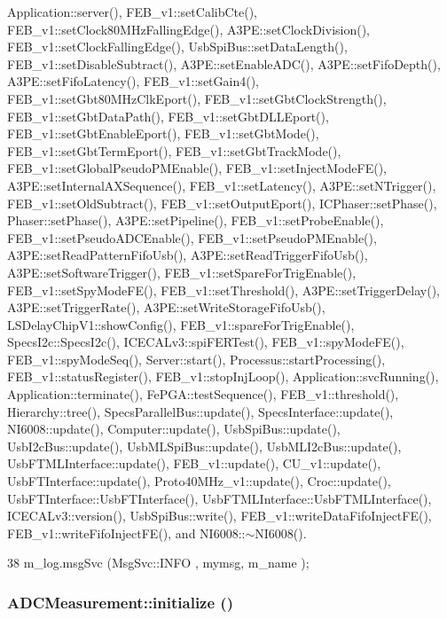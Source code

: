 Application::server(), FEB\_\-v1::setCalibCte(), FEB\_\-v1::setClock80MHzFallingEdge(), A3PE::setClockDivision(), FEB\_\-v1::setClockFallingEdge(), UsbSpiBus::setDataLength(), FEB\_\-v1::setDisableSubtract(), A3PE::setEnableADC(), A3PE::setFifoDepth(), A3PE::setFifoLatency(), FEB\_\-v1::setGain4(), FEB\_\-v1::setGbt80MHzClkEport(), FEB\_\-v1::setGbtClockStrength(), FEB\_\-v1::setGbtDataPath(), FEB\_\-v1::setGbtDLLEport(), FEB\_\-v1::setGbtEnableEport(), FEB\_\-v1::setGbtMode(), FEB\_\-v1::setGbtTermEport(), FEB\_\-v1::setGbtTrackMode(), FEB\_\-v1::setGlobalPseudoPMEnable(), FEB\_\-v1::setInjectModeFE(), A3PE::setInternalAXSequence(), FEB\_\-v1::setLatency(), A3PE::setNTrigger(), FEB\_\-v1::setOldSubtract(), FEB\_\-v1::setOutputEport(), ICPhaser::setPhase(), Phaser::setPhase(), A3PE::setPipeline(), FEB\_\-v1::setProbeEnable(), FEB\_\-v1::setPseudoADCEnable(), FEB\_\-v1::setPseudoPMEnable(), A3PE::setReadPatternFifoUsb(), A3PE::setReadTriggerFifoUsb(), A3PE::setSoftwareTrigger(), FEB\_\-v1::setSpareForTrigEnable(), FEB\_\-v1::setSpyModeFE(), FEB\_\-v1::setThreshold(), A3PE::setTriggerDelay(), A3PE::setTriggerRate(), A3PE::setWriteStorageFifoUsb(), LSDelayChipV1::showConfig(), FEB\_\-v1::spareForTrigEnable(), SpecsI2c::SpecsI2c(), ICECALv3::spiFERTest(), FEB\_\-v1::spyModeFE(), FEB\_\-v1::spyModeSeq(), Server::start(), Processus::startProcessing(), FEB\_\-v1::statusRegister(), FEB\_\-v1::stopInjLoop(), Application::svcRunning(), Application::terminate(), FePGA::testSequence(), FEB\_\-v1::threshold(), Hierarchy::tree(), SpecsParallelBus::update(), SpecsInterface::update(), NI6008::update(), Computer::update(), UsbSpiBus::update(), UsbI2cBus::update(), UsbMLSpiBus::update(), UsbMLI2cBus::update(), UsbFTMLInterface::update(), FEB\_\-v1::update(), CU\_\-v1::update(), UsbFTInterface::update(), Proto40MHz\_\-v1::update(), Croc::update(), UsbFTInterface::UsbFTInterface(), UsbFTMLInterface::UsbFTMLInterface(), ICECALv3::version(), UsbSpiBus::write(), FEB\_\-v1::writeDataFifoInjectFE(), FEB\_\-v1::writeFifoInjectFE(), and NI6008::$\sim$NI6008().


\begin{DoxyCode}
38 { m_log.msgSvc (MsgSvc::INFO    , mymsg, m_name ); }
\end{DoxyCode}
\hypertarget{classADCMeasurement_a3fc6d3e863fecc7a1caf91f9b0ca5268}{
\subsubsection[{initialize}]{ ADCMeasurement::initialize ()}}
\label{classADCMeasurement_a3fc6d3e863fecc7a1caf91f9b0ca5268}


